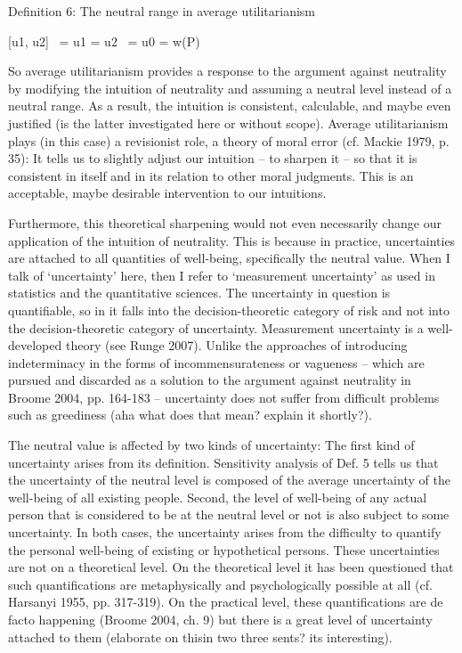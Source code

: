 Definition 6: The neutral range in average utilitarianism 

[u1, u2] \ = u1 = u2 \ = u0 = w(P) 

So average utilitarianism provides a response to the argument against neutrality by modifying the intuition of neutrality and assuming a neutral level instead of a neutral range. As a result, the intuition is consistent, calculable, and maybe even justified (is the latter investigated here or without scope). Average utilitarianism plays (in this case) a revisionist role, a theory of moral error (cf. \label{ref:RNDPRdjZzChhe}Mackie 1979, p. 35): It tells us to slightly adjust our intuition – to sharpen it – so that it is consistent in itself and in its relation to other moral judgments. This is an acceptable, maybe desirable intervention to our intuitions.  

Furthermore, this theoretical sharpening would not even necessarily change our application of the intuition of neutrality. This is because in practice, uncertainties are attached to all quantities of well-being, specifically the neutral value. When I talk of ‘uncertainty’ here, then I refer to ‘measurement uncertainty’ as used in statistics and the quantitative sciences. The uncertainty in question is quantifiable, so in it falls into the decision-theoretic category of risk and not into the decision-theoretic category of uncertainty. Measurement uncertainty is a well-developed theory (see \label{ref:RND01V7wRHfk9}Runge 2007). Unlike the approaches of introducing indeterminacy in the forms of incommensurateness or vagueness – which are pursued and discarded as a solution to the argument against neutrality in \label{ref:RNDOSiB2XiJlM}Broome 2004, pp. 164-183 – uncertainty does not suffer from difficult problems such as greediness (aha what does that mean? explain it shortly?).  

The neutral value is affected by two kinds of uncertainty: The first kind of uncertainty arises from its definition. Sensitivity analysis of Def. 5 tells us that the uncertainty of the neutral level is composed of the average uncertainty of the well-being of all existing people. Second, the level of well-being of any actual person that is considered to be at the neutral level or not is also subject to some uncertainty. In both cases, the uncertainty arises from the difficulty to quantify the personal well-being of existing or hypothetical persons. These uncertainties are not on a theoretical level. On the theoretical level it has been questioned that such quantifications are metaphysically and psychologically possible at all (cf. \label{ref:RNDA24nrQa53E}Harsanyi 1955, pp. 317-319). On the practical level, these quantifications are de facto happening (\label{ref:RNDPDFrWFZort}Broome 2004, ch. 9) but there is a great level of uncertainty attached to them (elaborate on thisin two three sents? its interesting).  

